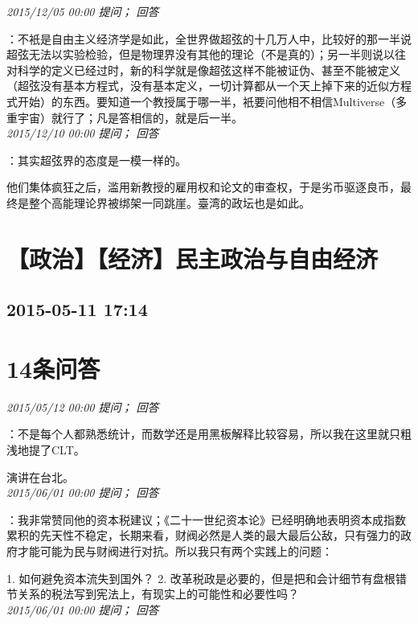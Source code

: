 \documentclass[twocolumn]{ctexart}
\begin{document}
\textit{\hfill\noindent\small 2015/12/05 00:00 提问； 回答}

：不衹是自由主义经济学是如此，全世界做超弦的十几万人中，比较好的那一半说超弦无法以实验检验，但是物理界没有其他的理论（不是真的）；另一半则说以往对科学的定义已经过时，新的科学就是像超弦这样不能被证伪、甚至不能被定义（超弦没有基本方程式，没有基本定义，一切计算都从一个天上掉下来的近似方程式开始）的东西。要知道一个教授属于哪一半，衹要问他相不相信Multiverse（多重宇宙）就行了；凡是答相信的，就是后一半。\\

\textit{\hfill\noindent\small 2015/12/10 00:00 提问； 回答}

：其实超弦界的态度是一模一样的。

他们集体疯狂之后，滥用新教授的雇用权和论文的审查权，于是劣币驱逐良币，最终是整个高能理论界被绑架一同跳崖。臺湾的政坛也是如此。\\


\section{【政治】【经济】民主政治与自由经济}
\subsection{2015-05-11 17:14}


\section{14条问答}

\textit{\hfill\noindent\small 2015/05/12 00:00 提问； 回答}

：不是每个人都熟悉统计，而数学还是用黑板解释比较容易，所以我在这里就只粗浅地提了CLT。

演讲在台北。\\

\textit{\hfill\noindent\small 2015/06/01 00:00 提问； 回答}

：我非常赞同他的资本税建议；《二十一世纪资本论》已经明确地表明资本成指数累积的先天性不稳定，长期来看，财阀必然是人类的最大最后公敌，只有强力的政府才能可能为民与财阀进行对抗。所以我只有两个实践上的问题：

1. 如何避免资本流失到国外？
2. 改革税政是必要的，但是把和会计细节有盘根错节关系的税法写到宪法上，有现实上的可能性和必要性吗？\\

\textit{\hfill\noindent\small 2015/06/01 00:00 提问； 回答}
\end{document}
